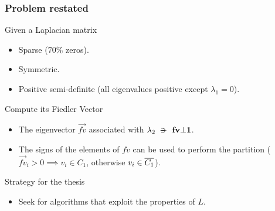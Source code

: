 \begin{frame}
  \frametitle{Problem restated}
  \begin{block}{Given a Laplacian matrix}
    \begin{itemize}
    \item Sparse ($70\%$ zeros).
    \item Symmetric.
    \item Positive semi-definite (all eigenvalues positive except $\lambda_1=0$).
    \end{itemize}
  \end{block}
  \begin{block}{Compute its Fiedler Vector}
    \begin{itemize}
    \item The eigenvector $\vec{fv}$ associated with $\lambda_2 \suchthat \vec{fv} \bot \vec{1}$. 
    \item The signs of the elements of $fv$ can be used to perform the partition ($\vec{fv}_i > 0 \implies v_i \in C_1$, otherwise $v_i \in \overline{C_1}$).
    \end{itemize}
  \end{block}
  \begin{block}{Strategy for the thesis}
    \begin{itemize}
    \item Seek for algorithms that exploit the properties of $L$.
    \end{itemize}
  \end{block}    
\end{frame}
